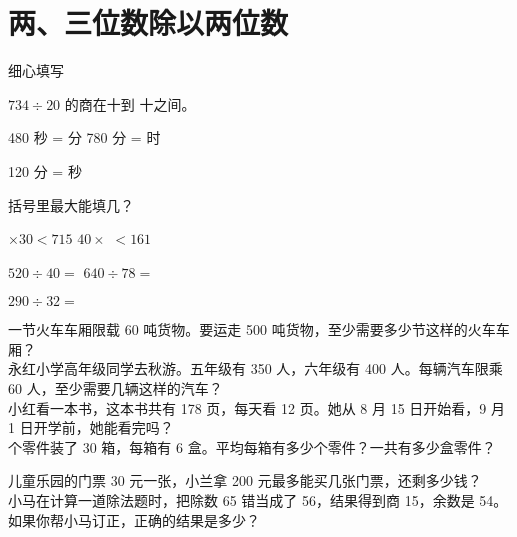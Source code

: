 
\section{两、三位数除以两位数}


\xiaoti 细心填写

$734 \div 20$ 的商在\parentheses 十到 \parentheses 十之间。

480 秒 = \parentheses 分 \hspace{8em} 780 分 = \parentheses 时

120 分 = \parentheses 秒

\xiaoti 括号里最大能填几？

\parentheses $\times 30 < 715$ \hspace{8em} $40 \times $ \parentheses  $< 161$


$520 \div 40 = $ \hspace{12em}  $640\div 78=$

$290 \div 32 = $



\xiaoti 一节火车车厢限载 60 吨货物。要运走 500 吨货物，至少需要多少节这样的火车车厢？\\[20mm]

\xiaoti 永红小学高年级同学去秋游。五年级有 350 人，六年级有 400 人。每辆汽车限乘 60 人，至少需要几辆这样的汽车？ \\[20mm]

\xiaoti 小红看一本书，这本书共有 178 页，每天看 12 页。她从 8 月 15 日开始看，9 月 1 日开学前，她能看完吗？ \\[20mm]

 个零件装了 30 箱，每箱有 6 盒。平均每箱有多少个零件？一共有多少盒零件？ \\[20mm]



\xiaoti 儿童乐园的门票 30 元一张，小兰拿 200 元最多能买几张门票，还剩多少钱？\\[20mm]

\xiaoti 小马在计算一道除法题时，把除数 65 错当成了 56，结果得到商 15，余数是 54。如果你帮小马订正，正确的结果是多少？\\[20mm]

